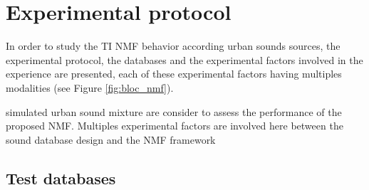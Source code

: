 \documentclass[12pt,english,twoside]{article}
\begin{document}
\section{Experimental protocol}\label{part:protocol}

In order to study the TI NMF behavior according urban sounds sources, the experimental protocol, the databases and the experimental factors involved in the experience are presented, each of these experimental factors having multiples modalities (see Figure \ref{fig:bloc_nmf}).  

simulated urban sound mixture are consider to assess the performance of the proposed NMF. 
Multiples experimental factors are involved here between the sound database design and the NMF framework 

\subsection{Test databases}\label{part:test_datase}
\end{document}
